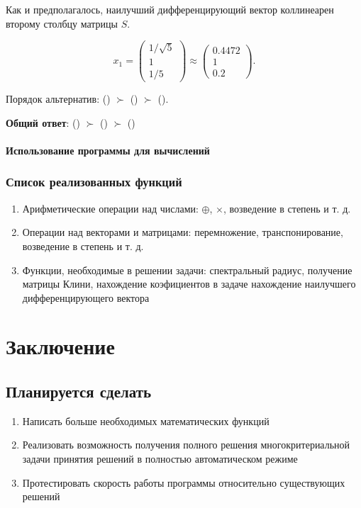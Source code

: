 \documentclass[specialist,
  substylefile = spbu.rtx,
  href,
  colorlinks=true,
  12pt]{disser}
\begin{document}
	Как и предполагалось, наилучший дифференцирующий вектор коллинеарен второму столбцу матрицы \(S\).
	
	\[
	x_1 = \begin{pmatrix}
		1/\sqrt{5}\\1\\1/5
	\end{pmatrix} \approx \begin{pmatrix}
		0.4472 \\ 1 \\ 0.2
	\end{pmatrix}.
	\]
	
	Порядок альтернатив: () \(\succ\) () \(\succ\) ().
	
	\textbf{Общий ответ}: () \(\succ\) () \(\succ\) ()
	\subsubsection{Использование программы для вычислений}



\subsection{Список реализованных функций}
  \begin{enumerate}
    \item Арифметические операции над числами: $\oplus$, $\times$, возведение в степень и т. д. 
    \item Операции над векторами и матрицами: перемножение, транспонирование, возведение в степень и т. д.
    \item Функции, необходимые в решении задачи: спектральный радиус, получение матрицы Клини, нахождение коэфициентов в задаче нахождение наилучшего дифференцирующего вектора
  \end{enumerate}

\chapter{Заключение}
\section{Планируется сделать}
  \begin{enumerate}
  	\item Написать больше необходимых математических функций
    \item Реализовать возможность получения полного решения многокритериальной задачи принятия решений в полностью автоматическом режиме
    \item Протестировать скорость работы программы относительно существующих решений
  \end{enumerate}
\end{document}
